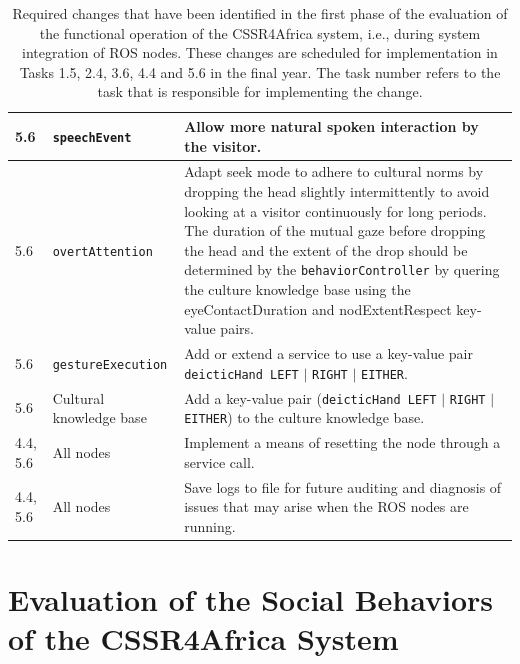 \documentclass{CSSRforAfrica}
\begin{document}
\begin{center}
\begin{table}[H]
\begin{tabularx}{\linewidth}{| l | l | X |}
\hline
{\footnotesize 5.6 }  & {\footnotesize \verb+speechEvent+}     & {\footnotesize  Allow more natural spoken interaction by the visitor.} \\ 
\hline
{\footnotesize 5.6 }  & {\footnotesize \verb+overtAttention +}     & {\footnotesize  Adapt  seek mode to adhere to cultural norms by dropping the head slightly intermittently to avoid looking at a visitor continuously for long periods. The duration of the mutual gaze before dropping the head and the extent of  the drop should be determined by the \verb+behaviorController+ by quering the culture knowledge base using the eyeContactDuration  and nodExtentRespect key-value pairs.} \\ 
\hline
{\footnotesize 5.6 }  & {\footnotesize \verb+gestureExecution+}     & {\footnotesize Add or extend a service to use a key-value pair \verb+deicticHand LEFT+ $\mid$ \verb+RIGHT+ $\mid$ \verb+EITHER+. } \\ 
\hline
{\footnotesize 5.6 }  & {\footnotesize Cultural knowledge base}     & {\footnotesize  Add a key-value pair (\verb+deicticHand LEFT+ $\mid$ \verb+RIGHT+ $\mid$ \verb+EITHER+) to the culture knowledge base.  } \\ 
\hline
{\footnotesize 4.4, 5.6 }  & {\footnotesize All nodes}     & {\footnotesize  Implement  a means of resetting the node through a service call.} \\
\hline
{\footnotesize 4.4, 5.6 }  & {\footnotesize All nodes}     & {\footnotesize  Save logs to file for future auditing and diagnosis of issues that may arise when the ROS nodes are running.} \\
\hline
\end{tabularx}
\caption{Required changes that have been identified in the first phase of the evaluation of the functional operation of the CSSR4Africa system, i.e., during system integration of ROS nodes. These changes are scheduled for implementation in Tasks  1.5, 2.4, 3.6,  4.4 and 5.6 in the final year. The task number refers to the task that is responsible for implementing the change.}
\label{table:phase1b}
\end{table}
\end{center}



\section{Evaluation of the Social Behaviors of the CSSR4Africa System}
 \label{section:social_evaluation}
\end{document}

